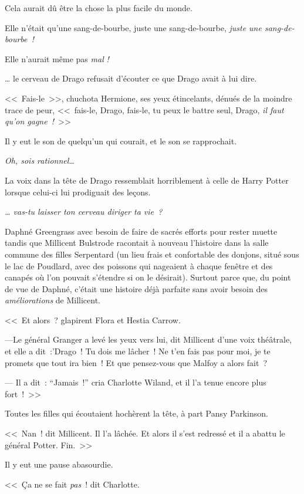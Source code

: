 Cela aurait dû être la chose la plus facile du monde.

Elle n'était qu'une sang-de-bourbe, juste une sang-de-bourbe, \emph{juste une sang-de-bourbe~!}

Elle n'aurait même pas \emph{mal} \emph{!}

… le cerveau de Drago refusait d'écouter ce que Drago avait à lui dire.

<<~Fais-le~>>, chuchota Hermione, ses yeux étincelants, dénués de la moindre trace de peur, <<~fais-le, Drago, fais-le, tu peux le battre seul, Drago, \emph{il faut qu'on gagne~!}~>>

Il y eut le son de quelqu'un qui courait, et le son se rapprochait.

\emph{Oh, sois rationnel…}

La voix dans la tête de Drago ressemblait horriblement à celle de Harry Potter lorsque celui-ci lui prodiguait des leçons.

\emph{… vas-tu laisser ton cerveau diriger ta vie~?}


Daphné Greengrass avec besoin de faire de sacrés efforts pour rester muette tandis que Millicent Bulstrode racontait à nouveau l'histoire dans la salle commune des filles Serpentard (un lieu frais et confortable des donjons, situé sous le lac de Poudlard, avec des poissons qui nageaient à chaque fenêtre et des canapés où l'on pouvait s'étendre si on le désirait). Surtout parce que, du point de vue de Daphné, c'était une histoire déjà parfaite sans avoir besoin des \emph{améliorations} de Millicent.

<<~Et alors~? glapirent Flora et Hestia Carrow.

---Le général Granger a levé les yeux vers lui, dit Millicent d'une voix théâtrale, et elle a dit~:'Drago~! Tu dois me lâcher~! Ne t'en fais pas pour moi, je te promets que tout ira bien~! Et que pensez-vous que Malfoy a alors fait~?

--- Il a dit~: “Jamais~!” cria Charlotte Wiland, et il l'a tenue encore plus fort~!~>>

Toutes les filles qui écoutaient hochèrent la tête, à part Pansy Parkinson.

<<~Nan~! dit Millicent. Il l'a lâchée. Et alors il s'est redressé et il a abattu le général Potter. Fin.~>>

Il y eut une pause abasourdie.

<<~Ça ne se fait \emph{pas}~! dit Charlotte.

